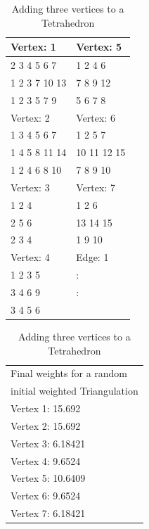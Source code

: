 \documentclass[12pt]{article}
\begin{document}
\begin{table}

\begin{minipage}[ht]{0.5\linewidth}

\begin{tabular}{|l|l|}
\hline
 Vertex: 1 &  Vertex: 5 \\
\hline
2 3 4 5 6 7  &   1 2 4 6  \\

1 2 3 7 10 13  &  7 8 9 12  \\

1 2 3 5 7 9  &   5 6 7 8  \\
\hline
 Vertex: 2 &  Vertex: 6 \\
\hline
1 3 4 5 6 7  &   1 2 5 7  \\

1 4 5 8 11 14  & 10 11 12 15  \\

1 2 4 6 8 10  &  7 8 9 10  \\
\hline
 Vertex: 3 &  Vertex: 7 \\
\hline
    1 2 4  &     1 2 6  \\

    2 5 6  &  13 14 15  \\

    2 3 4  &    1 9 10  \\
\hline
 Vertex: 4 &  Edge: 1    \\ 
\hline
  1 2 3 5  &   :         \\

  3 4 6 9  &   :         \\

  3 4 5 6  &            \\ 
\hline

\end{tabular}


\end{minipage}
\begin{minipage}[b]{0.5\linewidth}

\begin{tabular}{|l|}
\hline
Final weights for a random \\

initial weighted Triangulation \\
\hline
Vertex 1: 15.692 \\

Vertex 2: 15.692 \\

Vertex 3: 6.18421 \\

Vertex 4: 9.6524 \\

Vertex 5: 10.6409 \\

Vertex 6: 9.6524 \\

Vertex 7: 6.18421 \\
\hline
\end{tabular}
\end{minipage}
\caption{Adding three vertices to a Tetrahedron}
\label{tab:weightTab}
\end{table}
\end{document}
